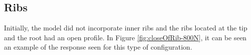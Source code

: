   \clearpage
  \subsection{Ribs} \label{subsec:ribs_results_model}

    Initially, the model did not incorporate inner ribs and the ribs located at the tip and the root had an open profile. In Figure \ref{fig:closeOfRib-800N}, it can be seen an example of the response seen for this type of configuration.

